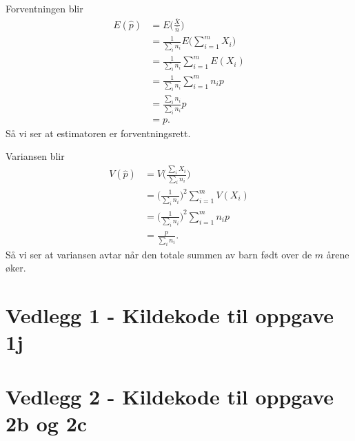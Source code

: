 \documentclass[a4paper, 11pt, titlepage, english]{article}
\begin{document}
Forventningen blir
\begin{align*}
E(\hat{p}) &= E\bigg(\frac{\overline{X}}{\bar{n}}\bigg) \\
&= \frac{1}{\sum_i n_i}E\bigg(\sum_{i=1}^m X_i\bigg) \\
&= \frac{1}{\sum_i n_i}\sum_{i=1}^m E(X_i) \\
&= \frac{1}{\sum_i n_i}\sum_{i=1}^m n_i p \\
&= \frac{\sum_i n_i}{\sum_i n_i} p \\
&= p.
\end{align*}
Så vi ser at estimatoren er forventningsrett.

Variansen blir
\begin{align*}
V(\hat{p}) &= V\bigg(\frac{\sum_i X_i}{\sum_i n_i}\bigg) \\
&= \bigg(\frac{1}{\sum_i n_i}\bigg)^2\sum_{i=1}^m V(X_i) \\
&= \bigg(\frac{1}{\sum_i n_i}\bigg)^2\sum_{i=1}^m n_i p \\
&= \frac{p}{\sum_i n_i}.
\end{align*}
Så vi ser at variansen avtar når den totale summen av barn født over de $m$ årene øker.

\clearpage

\section*{Vedlegg 1 - Kildekode til oppgave 1j}


\clearpage

\section*{Vedlegg 2 - Kildekode til oppgave 2b og 2c}

\end{document}
